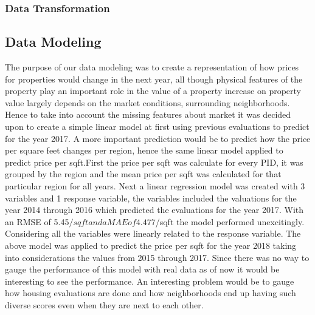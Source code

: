 \documentclass[12pt]{article}
\begin{document}
\subsubsection{Data Transformation}



\subsection{Data Modeling}
The purpose of our data modeling was to create a representation of how
prices for properties would change in the next year, all though physical
features of the property play an important role in the value of a property
increase on property value largely depends on the market conditions, surrounding
neighborhoods. Hence to take into account the missing features about market 
it was decided upon to create a simple linear model at first using previous evaluations
to predict for the year 2017. A more important prediction would be to predict how the price
per square feet changes per region, hence the same linear model applied to predict
price per sqft.First the price per sqft was calculate for every PID, it was grouped by
the region and the mean price per sqft was calculated for that particular region for all years. Next a linear regression model was created with 3 variables and 1 response variable, the variables included the valuations for the year 2014 through 2016 which predicted the evaluations for the year 2017. With an RMSE of 5.45$/sqft and a MAE of 4.477$/sqft the model performed unexcitingly. Considering all the variables were linearly related to the response variable. The above model was applied to predict the price per sqft for the year 2018 taking into considerations the values from 2015 through 2017. Since there was no way to gauge the performance of this model with real data as of now it would be interesting to see the performance.
An interesting problem would be to gauge how housing evaluations are done and how neighborhoods 
end up having such diverse scores even when they are next to each other.
\end{document}
